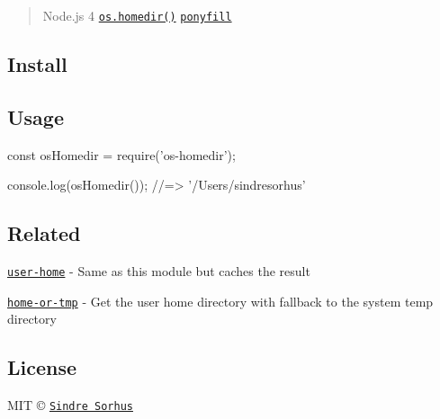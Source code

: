 \begin{quote}
Node.\+js 4 \href{https://nodejs.org/api/os.html#os_os_homedir}{\tt {\ttfamily os.\+homedir()}} \href{https://ponyfill.com}{\tt ponyfill} \end{quote}


\subsection*{Install}




\subsection*{Usage}


\begin{DoxyCode}
const osHomedir = require('os-homedir');

console.log(osHomedir());
//=> '/Users/sindresorhus'
\end{DoxyCode}


\subsection*{Related}


\begin{DoxyItemize}
\item \href{https://github.com/sindresorhus/user-home}{\tt user-\/home} -\/ Same as this module but caches the result
\item \href{https://github.com/sindresorhus/home-or-tmp}{\tt home-\/or-\/tmp} -\/ Get the user home directory with fallback to the system temp directory
\end{DoxyItemize}

\subsection*{License}

M\+IT © \href{https://sindresorhus.com}{\tt Sindre Sorhus} 